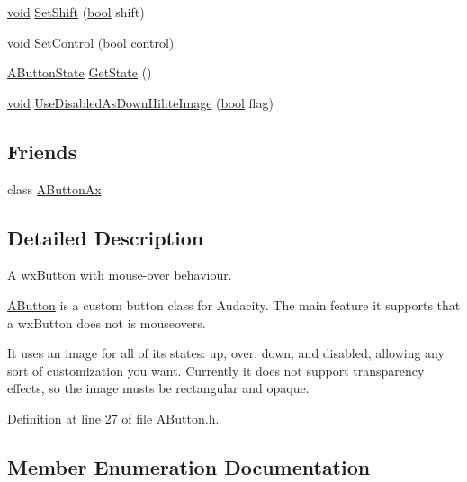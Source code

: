 \begin{DoxyCompactItemize}
\item 
\hyperlink{sound_8c_ae35f5844602719cf66324f4de2a658b3}{void} \hyperlink{class_a_button_a07ffef4c6050acab50acc5f4f937db3d}{Set\+Shift} (\hyperlink{mac_2config_2i386_2lib-src_2libsoxr_2soxr-config_8h_abb452686968e48b67397da5f97445f5b}{bool} shift)
\item 
\hyperlink{sound_8c_ae35f5844602719cf66324f4de2a658b3}{void} \hyperlink{class_a_button_a1030f927f1de9e478a3b5df1f4b22b57}{Set\+Control} (\hyperlink{mac_2config_2i386_2lib-src_2libsoxr_2soxr-config_8h_abb452686968e48b67397da5f97445f5b}{bool} control)
\item 
\hyperlink{class_a_button_a2a19d9c33e99070a58b412676c6e3a83}{A\+Button\+State} \hyperlink{class_a_button_ab3eb39e7cc7a3b929a3f6e7036e6b4ac}{Get\+State} ()
\item 
\hyperlink{sound_8c_ae35f5844602719cf66324f4de2a658b3}{void} \hyperlink{class_a_button_a25ff7bb94e54daffd49e96d9665b5e52}{Use\+Disabled\+As\+Down\+Hilite\+Image} (\hyperlink{mac_2config_2i386_2lib-src_2libsoxr_2soxr-config_8h_abb452686968e48b67397da5f97445f5b}{bool} flag)
\end{DoxyCompactItemize}
\subsection*{Friends}
\begin{DoxyCompactItemize}
\item 
class \hyperlink{class_a_button_a8017401a0ece8cee5c31daf38ce88838}{A\+Button\+Ax}
\end{DoxyCompactItemize}


\subsection{Detailed Description}
A wx\+Button with mouse-\/over behaviour. 

\hyperlink{class_a_button}{A\+Button} is a custom button class for Audacity. The main feature it supports that a wx\+Button does not is mouseovers.

It uses an image for all of its states\+: up, over, down, and disabled, allowing any sort of customization you want. Currently it does not support transparency effects, so the image musts be rectangular and opaque. 

Definition at line 27 of file A\+Button.\+h.



\subsection{Member Enumeration Documentation}
